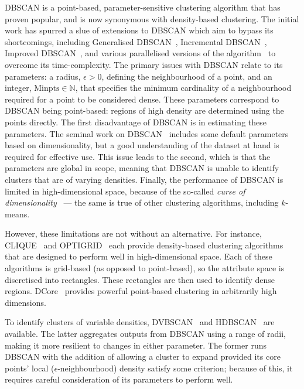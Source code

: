 DBSCAN is a point-based, parameter-sensitive clustering algorithm that has
proven popular, and is now synonymous with density-based clustering. The initial
work has spurred a slue of extensions to DBSCAN which aim to bypass its
shortcomings, including Generalised DBSCAN~\cite{Sander1998}, Incremental
DBSCAN~\cite{Bakr2015,Ester1998}, Improved DBSCAN~\cite{Borah2004}, and various
parallelised versions of the algorithm~\cite{Bohm2009,He2011,Loh2014,Xu2002} to
overcome its time-complexity. The primary issues with DBSCAN relate to its
parameters: a radius, \(\epsilon > 0\), defining the neighbourhood of a point,
and an integer, \(\text{Minpts} \in \mathbb N\), that specifies the minimum
cardinality of a neighbourhood required for a point to be considered dense.
These parameters correspond to DBSCAN being point-based: regions of high density
are determined using the points directly. The first disadvantage of DBSCAN is in
estimating these parameters. The seminal work on DBSCAN~\cite{Ester1996}
includes some default parameters based on dimensionality, but a good
understanding of the dataset at hand is required for effective use. This issue
leads to the second, which is that the parameters are global in scope, meaning
that DBSCAN is unable to identify clusters that are of varying densities.
Finally, the performance of DBSCAN is limited in high-dimensional space, because
of the so-called \emph{curse of dimensionality}~\cite{Keogh2017} --- the same is
true of other clustering algorithms, including \(k\)-means.

However, these limitations are not without an alternative. For instance,
CLIQUE~\cite{Agrawal1998} and OPTIGRID~\cite{Hinneburg1999} each provide
density-based clustering algorithms that are designed to perform well in
high-dimensional space. Each of these algorithms is grid-based (as opposed to
point-based), so the attribute space is discretised into rectangles. These
rectangles are then used to identify dense regions.
DCore~\cite{Chen2018clustering} provides powerful point-based clustering in
arbitrarily high dimensions.

To identify clusters of variable densities, DVBSCAN~\cite{Ram2010} and
HDBSCAN~\cite{Campello2013} are available. The latter aggregates outputs from
DBSCAN using a range of radii, making it more resilient to changes in either
parameter. The former runs DBSCAN with the addition of allowing a cluster to
expand provided its core points' local (\(\epsilon\)-neighbourhood) density
satisfy some criterion; because of this, it requires careful consideration of
its parameters to perform well.

